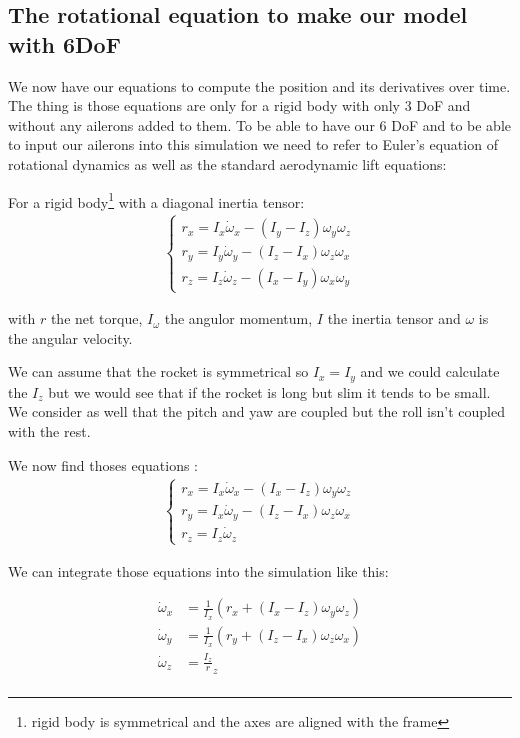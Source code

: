 \subsection{The rotational equation to make our model with 6DoF}

We now have our equations to compute the position and its derivatives over
time. The thing is those equations are only for a rigid body with only 3 DoF
and without any ailerons added to them. To be able to have our 6 DoF and to be
able to input our ailerons into this simulation we need to refer to Euler's
equation of rotational dynamics as well as the standard aerodynamic lift
equations:

For a rigid body\footnote{rigid body is symmetrical and the axes are aligned
    with the frame} with a diagonal inertia tensor:
\begin{gather*}
    \begin{cases}
        r_x = I_x \dot{\omega}_x - (I_y - I_z)\omega_y \omega_z \\
        r_y = I_y \dot{\omega}_y - (I_z - I_x)\omega_z \omega_x \\
        r_z = I_z \dot{\omega}_z - (I_x - I_y)\omega_x \omega_y
    \end{cases}
\end{gather*}

with $r$ the net torque, $I_\omega$ the angulor momentum, $I$ the inertia
tensor and $\omega$ is the angular velocity.

We can assume that the rocket is symmetrical so $I_x=I_y$ and we could
calculate the $I_z$ but we would see that if the rocket is long but slim it
tends to be small. We consider as well that the pitch and yaw are coupled but
the roll isn't coupled with the rest.

We now find thoses equations :
\begin{gather*}
    \begin{cases}
        r_x = I_x \dot{\omega}_x - (I_x - I_z)\omega_y \omega_z \\
        r_y = I_x \dot{\omega}_y - (I_z - I_x)\omega_z \omega_x \\
        r_z = I_z \dot{\omega}_z
    \end{cases}
\end{gather*}

We can integrate those equations into the simulation like this:

\begin{align*}
    \dot{\omega}_x & = \frac{1}{I_x}(r_x + (I_x - I_z)\omega_y \omega_z) \\
    \dot{\omega}_y & = \frac{1}{I_x}(r_y + (I_z - I_x)\omega_z \omega_x) \\
    \dot{\omega}_z & = \frac{I_z}r_z                                     \\
\end{align*}

